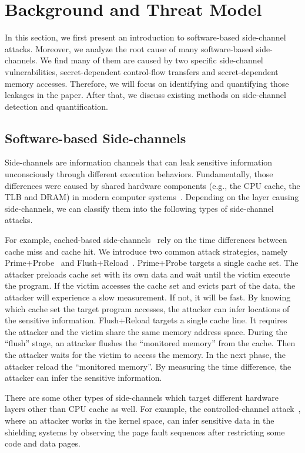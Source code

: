 \section{Background and Threat Model}
In this section, we first present an introduction to software-based 
side-channel attacks. Moreover, we analyze the root cause of many
software-based side-channels. We find many of them are caused by
two specific side-channel vulnerabilities, secret-dependent control-flow transfers and
secret-dependent memory accesses. Therefore, we will focus on identifying
and quantifying those leakages in the paper. After that, we 
discuss existing methods on side-channel detection and quantification.

\subsection{Software-based Side-channels}
Side-channels are information channels that can leak sensitive information 
unconsciously through different execution behaviors.  Fundamentally, those 
differences were caused by shared hardware
components (e.g., the CPU cache, the TLB and DRAM) 
in modern computer systems~\cite{ge2018survey,szefer2019survey}.
Depending on the layer causing side-channels, we can classify them 
into the following types of side-channel attacks.

For example, cached-based side-channels~\cite{yarom2017cachebleed,191010,184415,7163050,Osvik2006,liu2015last,yarom2014flush+} 
rely on the time differences 
between cache miss and cache hit. We introduce two common attack strategies,
namely Prime+Probe~\cite{liu2015last} and Flush+Reload~\cite{yarom2014flush+}.
Prime+Probe targets a single cache set. The attacker preloads cache set with
its own data and wait until the victim execute the program.
If the victim accesses the cache set and evicts part of 
the data, the attacker will experience a slow measurement. If not, 
it will be fast. By knowing which cache set the target
program accesses, the attacker can infer locations of
the sensitive information. Flush+Reload targets a single cache line. 
It requires the attacker and the victim share the same memory address space.
During the ``flush'' stage, an attacker 
flushes the ``monitored memory'' from the cache. Then the attacker
waits for the victim to access the memory. In the next phase, the 
attacker reload the ``monitored memory''. By measuring the time difference, the
attacker can infer the sensitive information.

There are some other types of side-channels which target different hardware layers other than  
CPU cache as well.
For example, the controlled-channel attack~\cite{7163052},
where an attacker works in the kernel space, can infer sensitive data in the shielding systems by
observing the page fault sequences after restricting some code and
data pages. 

